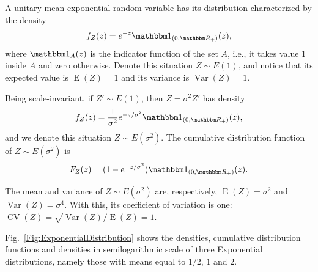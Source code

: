 \documentclass{beamer}
\newcommand{\E}{\operatorname{E}}
\newcommand{\Var}{\operatorname{Var}}
\newcommand{\CV}{\operatorname{CV}}
\begin{document}
\begin{frame}[allowframebreaks]
A unitary-mean exponential random variable has its distribution characterized by the density
\begin{equation}
f_Z(z) = e^{-z} \mathbbm 1_{(0,\mathbbm R_+)}(z),
\end{equation}
where $\mathbbm 1_{A}(z)$ is the indicator function of the set $A$, i.e., it takes value $1$ inside $A$ and zero otherwise.
Denote this situation $Z\sim E(1)$, and notice that its expected value is $\E(Z)=1$ and its variance is $\Var(Z)=1$.

Being scale-invariant, if $Z'\sim E(1)$, then $Z=\sigma^2 Z'$ has density
\begin{equation}
f_Z(z) = \frac{1}{\sigma^2}e^{-z/\sigma^2} \mathbbm 1_{(0,\mathbbm R_+)}(z),
\end{equation}
and we denote this situation $Z\sim E(\sigma^2)$.
The cumulative distribution function of $Z\sim E(\sigma^2)$ is 
\begin{equation}
F_Z(z) = (1-e^{-z/\sigma^2}) \mathbbm 1_{(0,\mathbbm R_+)}(z).
\end{equation}

The mean and variance of $Z\sim E(\sigma^2)$ are, respectively, $\E(Z)=\sigma^2$ and $\Var(Z) = \sigma^4$.
With this, its coefficient of variation is one: $\CV(Z) = \sqrt{\Var(Z)}/\E(Z) = 1$.

Fig.~\ref{Fig:ExponentialDistribution} shows the densities, cumulative distribution functions and densities in semilogarithmic scale of three Exponential distributions, namely those with means equal to $1/2$, $1$ and $2$.


\end{frame}
\end{document}
